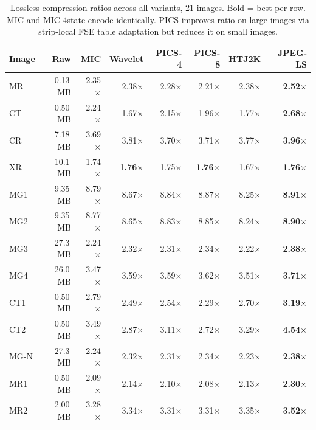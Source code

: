 \documentclass[10pt,twocolumn]{article}
\begin{document}
\begin{table}[h]
  \centering
  \caption{Lossless compression ratios across all variants, 21 images. Bold = best per row. MIC and MIC-4state encode identically. PICS improves ratio on large images via strip-local FSE table adaptation but reduces it on small images.}
  \label{tab:ratios}
  \small
  \setlength{\tabcolsep}{3pt}
  \begin{tabular}{lrrrrrrr}
    \toprule
    Image & Raw & MIC & Wavelet & PICS-4 & PICS-8 & HTJ2K & JPEG-LS \\
    \midrule
    MR  & 0.13\,MB & 2.35$\times$ & 2.38$\times$ & 2.28$\times$ & 2.21$\times$ & 2.38$\times$ & \textbf{2.52$\times$} \\
    CT  & 0.50\,MB & 2.24$\times$ & 1.67$\times$ & 2.15$\times$ & 1.96$\times$ & 1.77$\times$ & \textbf{2.68$\times$} \\
    CR  & 7.18\,MB & 3.69$\times$ & 3.81$\times$ & 3.70$\times$ & 3.71$\times$ & 3.77$\times$ & \textbf{3.96$\times$} \\
    XR  & 10.1\,MB & 1.74$\times$ & \textbf{1.76$\times$} & 1.75$\times$ & \textbf{1.76$\times$} & 1.67$\times$ & \textbf{1.76$\times$} \\
    MG1 & 9.35\,MB & 8.79$\times$ & 8.67$\times$ & 8.84$\times$ & 8.87$\times$ & 8.25$\times$ & \textbf{8.91$\times$} \\
    MG2 & 9.35\,MB & 8.77$\times$ & 8.65$\times$ & 8.83$\times$ & 8.85$\times$ & 8.24$\times$ & \textbf{8.90$\times$} \\
    MG3 & 27.3\,MB & 2.24$\times$ & 2.32$\times$ & 2.31$\times$ & 2.34$\times$ & 2.22$\times$ & \textbf{2.38$\times$} \\
    MG4 & 26.0\,MB & 3.47$\times$ & 3.59$\times$ & 3.59$\times$ & 3.62$\times$ & 3.51$\times$ & \textbf{3.71$\times$} \\
    CT1 & 0.50\,MB & 2.79$\times$ & 2.49$\times$ & 2.54$\times$ & 2.29$\times$ & 2.70$\times$ & \textbf{3.19$\times$} \\
    CT2 & 0.50\,MB & 3.49$\times$ & 2.87$\times$ & 3.11$\times$ & 2.72$\times$ & 3.29$\times$ & \textbf{4.54$\times$} \\
    MG-N & 27.3\,MB & 2.24$\times$ & 2.32$\times$ & 2.31$\times$ & 2.34$\times$ & 2.23$\times$ & \textbf{2.38$\times$} \\
    MR1 & 0.50\,MB & 2.09$\times$ & 2.14$\times$ & 2.10$\times$ & 2.08$\times$ & 2.13$\times$ & \textbf{2.30$\times$} \\
    MR2 & 2.00\,MB & 3.28$\times$ & 3.34$\times$ & 3.31$\times$ & 3.31$\times$ & 3.35$\times$ & \textbf{3.52$\times$} \\

\end{tabular}
\end{table}
\end{document}
